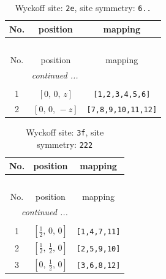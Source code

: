 \documentclass[fleqn,8pt]{jsarticle}
\begin{document}
\begin{longtable}{ccc}
\caption{Wyckoff site: {\tt 2e}, site symmetry: {\tt 6..}}
 \\
 \hline \hline
No. & position & mapping \\ \hline \endfirsthead

\multicolumn{2}{l}{\tablename\ \thetable{}} \\
 \hline \hline
No. & position & mapping \\ \hline \endhead

 \hline \hline
\multicolumn{2}{r}{\footnotesize\it continued ...} \\ \endfoot

 \hline \hline
\multicolumn{2}{r}{} \\ \endlastfoot

1 & $\left[ 0,\, 0,\, z \right]$ & {\tt [1,2,3,4,5,6]} \\ \hline
2 & $\left[ 0,\, 0,\, - z \right]$ & {\tt [7,8,9,10,11,12]} \\
\end{longtable}
\renewcommand{\arraystretch}{1.2}
\begin{longtable}{ccc}
\caption{Wyckoff site: {\tt 3f}, site symmetry: {\tt 222}}
 \\
 \hline \hline
No. & position & mapping \\ \hline \endfirsthead

\multicolumn{2}{l}{\tablename\ \thetable{}} \\
 \hline \hline
No. & position & mapping \\ \hline \endhead

 \hline \hline
\multicolumn{2}{r}{\footnotesize\it continued ...} \\ \endfoot

 \hline \hline
\multicolumn{2}{r}{} \\ \endlastfoot

1 & $\left[ \frac{1}{2},\, 0,\, 0 \right]$ & {\tt [1,4,7,11]} \\ \hline
2 & $\left[ \frac{1}{2},\, \frac{1}{2},\, 0 \right]$ & {\tt [2,5,9,10]} \\ \hline
3 & $\left[ 0,\, \frac{1}{2},\, 0 \right]$ & {\tt [3,6,8,12]} \\
\end{longtable}
\renewcommand{\arraystretch}{1.2}
\end{document}
